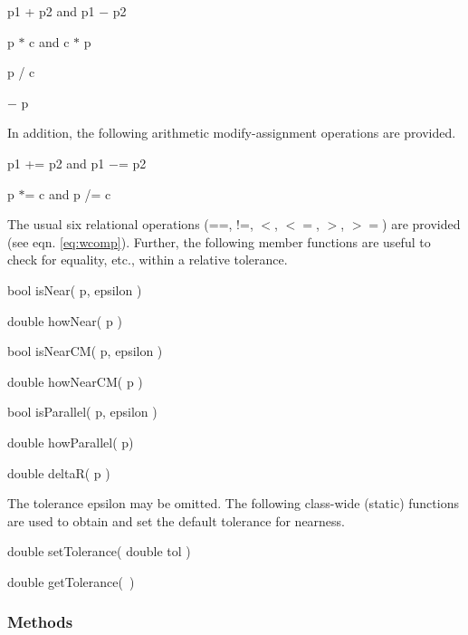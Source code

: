 \begin{shortlist}
  \item p1 + p2  and  p1 $-$ p2
  \item p $*$ c  and  c $*$ p
  \item p / c
  \item $-$ p
\end{shortlist}

\noindent
In addition, the following arithmetic modify-assignment operations are provided.

\begin{shortlist}
  \item p1 += p2  and  p1 $-$= p2
  \item p $*$= c  and  p /= c
\end{shortlist}

The usual six relational operations
(==, !=, $<$, $<=$, $>$, $>=$) are provided (see eqn. \ref{eq:wcomp}).
Further, the following member functions are useful
to check for equality, etc., within a relative tolerance.

\begin{shortlist}
  \item bool isNear( p, epsilon ) \see{\ref{eq:wisNear}}
  \item double howNear( p ) \see{\ref{eq:whowNear}, \ref{eq:whowNear:2}}
  \item bool isNearCM( p, epsilon ) \see{\ref{eq:wisNearCM}, \ref{eq:wisNearCM:2}}
  \item double howNearCM( p ) \see{\ref{eq:whowNearCM}, \ref{eq:whowNearCM:2}}
  \item bool isParallel( p, epsilon ) \see{\ref{eq:wisPar}, \ref{eq:wisPar:2}}
  \item double howParallel( p) \see{\ref{eq:whowPar}, \ref{eq:whowPar:2}}
  \item double deltaR( p ) \see{\ref{eq:deltaR}}
\end{shortlist}

\noindent
The tolerance epsilon may be omitted.
The following class-wide (static) functions are used
to obtain and set the default tolerance for nearness.

\begin{shortlist}
  \item double setTolerance( double tol )
  \item double getTolerance(~)
\end{shortlist}

\subsubsection{Methods}

